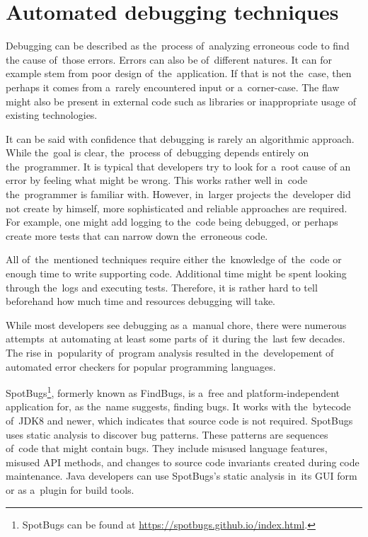 \chapter{Automated debugging techniques}\label{chap:automated}

Debugging can be described as the~process of~analyzing erroneous code to find 
the cause of~those errors. 
Errors can also be of~different natures.
It can for example stem from poor design of~the~application.
If that is not the~case, then perhaps it comes from a~rarely
encountered input or a~corner-case. 
The flaw might also be present
in external code such as libraries or inappropriate usage of
existing technologies.

It can be said with confidence that debugging is rarely an algorithmic
app\-roach.
While the~goal is clear, the~process of~debugging depends entirely 
on the~programmer.
It is typical that developers try to look for a~root cause
of an error by feeling what might be wrong.
This works rather well in~code the~programmer is familiar with.
However, in~larger projects the~developer did not create by himself,
more sophisticated and reliable approaches are required.
For example, one might add logging to the~code being debugged,
or perhaps create more tests that can narrow down the~erroneous code.

All of~the~mentioned techniques require either the~knowledge of~the~code 
or enough time to write supporting code. Additional time might be spent
looking through the~logs and executing tests. Therefore, it is rather
hard to tell be\-fore\-hand how much time and resources debugging will take.

While most developers see debugging as a~manual chore, there were numerous 
attempts~at automating at least some parts of~it during the~last few decades. 
The rise in~popularity of~program analysis resulted in the~developement of 
automated error checkers for popular programming languages. 

SpotBugs\footnote{SpotBugs can be found at 
\url{https://spotbugs.github.io/index.html}.}, formerly known as FindBugs, 
is a~free and platform-inde\-pen\-dent application for, as the~name 
suggests, finding bugs.
It works with the~bytecode of~JDK8 and newer, which indicates that source 
code is not required.
SpotBugs uses static analysis to discover bug patterns.
These patterns are sequences of~code that might contain bugs.
They include misused language features, misused API methods, and changes to 
source code invariants created during code maintenance.
Java developers can use SpotBugs's static analysis in~its GUI form or 
as a~plugin for build tools.

